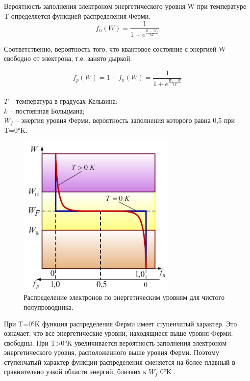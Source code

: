     \par Вероятность заполнения электроном энергетического уровня W при температуре T определяется функцией распределения Ферми. 
    \\
    \begin{equation}
    f_n(W) = \frac{1}{1+e^{\frac{W-W_f}{kT}}}
    \end{equation}
    
    \par Соответственно, вероятность того, что квантовое состояние с энергией W свободно от электрона, т.е. занято дыркой.
    
    \begin{equation}
    	f_p(W)= 1 - f_n(W) = \frac{1}{1+e^{\frac{W_f-W}{kT}}}
    \end{equation}
    \\
    \(T\) – температура в градусах Кельвина;\\ \(k\) – постоянная Больцмана; \\
    \(W_f\) – энергия уровня Ферми, вероятность заполнения которого равна 0,5 при T=0°K.
    
    \begin{figure}[h]
    	\centering
    	\includegraphics[height=8cm]{img/7} 
    	\captionsetup{font=footnotesize}
    	\caption{Распределение электронов по энергетическим уровням для чистого полупроводника.} 
    \end{figure}
    
    \par При T=0°K функция распределения Ферми имеет ступенчатый характер. Это означает, что все энергетические уровни, находящиеся выше уровня Ферми, свободны. При T>0°K увеличивается вероятность заполнения электроном энергетического уровня, расположенного выше уровня Ферми. Поэтому ступенчатый характер функции распределения сменяется на более плавный в сравнительно узкой области энергий, близких к \(W_f\) 0°K .

